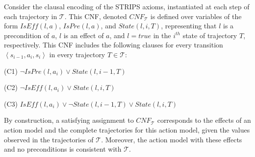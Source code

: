 \documentclass{article}
\theoremstyle{plain}
\theoremstyle{definition}
\theoremstyle{remark}
\theoremstyle{observation}
\newcommand{\tuple}[1]{\ensuremath{\left \langle #1 \right \rangle }}
\newcommand{\cnf}{\textit{CNF}}
\newcommand{\true}{\textit{true}}
\newcommand{\iseff}{\textit{IsEff}}
\newcommand{\ispre}{\textit{IsPre}}
\newcommand{\state}{\textit{State}}
\begin{document}
Consider the clausal encoding of the STRIPS axioms, instantiated at each step of each trajectory in $\mathcal{T}$. 
This CNF, denoted $\cnf_\mathcal{T}$ is defined over variables of the form $\iseff(l,a)$, $\ispre(l,a)$, and $\state(l,i,T)$, representing that 
$l$ is a precondition of $a$, 
$l$ is an effect of $a$, 
and $l=\true$ in the $i^{th}$ state of trajectory $T$, respectively.  
This CNF includes the following clauses for every transition $\tuple{s_{i-1},a_i,s_i}$ in every trajectory $T\in\mathcal{T}$:
\begin{compactitem}
\item (C1) $\neg \ispre(l,a_i)\vee \state(l,i-1,T)$
\item (C2) $\neg \iseff(l,a_i)\vee \state(l,i,T)$
\item (C3) $\iseff(l,a_i)\vee \neg \state(l,i-1,T) \vee \state(l,i,T)$
\end{compactitem}
By construction, a satisfying assignment to $\cnf_{\mathcal{T}}$ corresponds to the effects of an action model and the complete trajectories for this action model, given the values observed in the trajectories of $\mathcal{T}$. Moreover, the action model with these effects and no preconditions is consistent with $\mathcal{T}$. 
\end{document}
